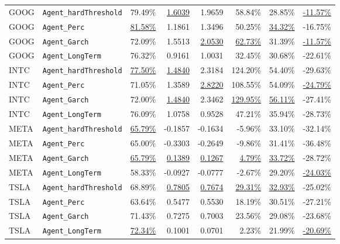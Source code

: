 ﻿\documentclass{article}
\begin{document}
\begin{longtable}{llrrrrrr}
\midrule
GOOG & \texttt{Agent\_hardThreshold} & 79.49\% & \underline{1.6039} & 1.9659 & 58.84\% & 28.85\% & \underline{-11.57\%} \\
GOOG & \texttt{Agent\_Perc}          & \underline{81.58\%} & 1.1861 & 1.3496 & 50.25\% & \underline{34.32\%} & -16.75\% \\
GOOG & \texttt{Agent\_Garch}         & 72.09\% & 1.5513 & \underline{2.0530} & \underline{62.73\%} & 31.39\% & \underline{-11.57\%} \\
GOOG & \texttt{Agent\_LongTerm}      & 76.32\% & 0.9161 & 1.0031 & 32.45\% & 30.68\% & -22.61\% \\
\midrule
INTC & \texttt{Agent\_hardThreshold} & \underline{77.50\%} & \underline{1.4840} & 2.3184 & 124.20\% & 54.40\% & -29.63\% \\
INTC & \texttt{Agent\_Perc}          & 71.05\% & 1.3589 & \underline{2.8220} & 108.55\% & 54.09\% & \underline{-24.79\%} \\
INTC & \texttt{Agent\_Garch}         & 72.00\% & \underline{1.4840} & 2.3462 & \underline{129.95\%} & \underline{56.11\%} & -27.41\% \\
INTC & \texttt{Agent\_LongTerm}      & 76.09\% & 1.0758 & 0.9528 & 47.21\% & 35.94\% & -28.73\% \\
\midrule
META & \texttt{Agent\_hardThreshold} & \underline{65.79\%} & -0.1857 & -0.1634 & -5.96\% & 33.10\% & -32.14\% \\
META & \texttt{Agent\_Perc}          & 65.00\% & -0.3303 & -0.2649 & -9.86\% & 31.41\% & -36.48\% \\
META & \texttt{Agent\_Garch}         & \underline{65.79\%} & \underline{0.1389} & \underline{0.1267} & \underline{4.79\%} & \underline{33.72\%} & -28.72\% \\
META & \texttt{Agent\_LongTerm}      & 58.33\% & -0.0927 & -0.0777 & -2.67\% & 29.20\% & \underline{-24.03\%} \\
\midrule
TSLA & \texttt{Agent\_hardThreshold} & 68.89\% & \underline{0.7805} & \underline{0.7674} & \underline{29.31\%} & \underline{32.93\%} & -25.02\% \\
TSLA & \texttt{Agent\_Perc}          & 63.64\% & 0.5477 & 0.5530 & 18.19\% & 30.51\% & -27.21\% \\
TSLA & \texttt{Agent\_Garch}         & 71.43\% & 0.7275 & 0.7003 & 23.56\% & 29.08\% & -23.68\% \\
TSLA & \texttt{Agent\_LongTerm}      & \underline{72.34\%} & 0.1001 & 0.0701 & 2.23\% & 21.99\% & \underline{-20.69\%} \\
\bottomrule
\end{longtable}
\endgroup
\end{document}
